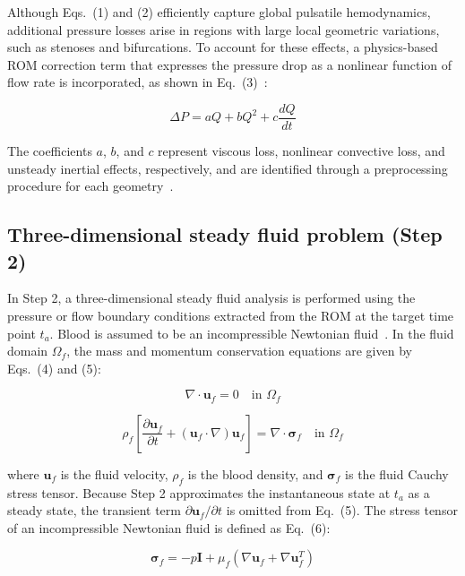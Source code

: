 \documentclass[master,english,final]{kaist-ucs}
\begin{document}
Although Eqs.~(1) and (2) efficiently capture global pulsatile hemodynamics, additional pressure losses arise in regions with large local geometric variations, such as stenoses and bifurcations. To account for these effects, a physics-based ROM correction term that expresses the pressure drop as a nonlinear function of flow rate is incorporated, as shown in Eq.~(3)~\cite{choi2025rom}:

\begin{equation}
\Delta P = aQ + bQ^2 + c\frac{dQ}{dt}
\end{equation}

The coefficients $a$, $b$, and $c$ represent viscous loss, nonlinear convective loss, and unsteady inertial effects, respectively, and are identified through a preprocessing procedure for each geometry~\cite{choi2025rom}.

\subsection{Three-dimensional steady fluid problem (Step 2)}
In Step 2, a three-dimensional steady fluid analysis is performed using the pressure or flow boundary conditions extracted from the ROM at the target time point $t_a$. Blood is assumed to be an incompressible Newtonian fluid~\cite{ku1997blood}. In the fluid domain $\Omega_f$, the mass and momentum conservation equations are given by Eqs.~(4) and (5):

\begin{equation}
\nabla \cdot \mathbf{u}_f = 0 \quad \text{in } \Omega_f
\end{equation}

\begin{equation}
\rho_f \left[\frac{\partial \mathbf{u}_f}{\partial t} + (\mathbf{u}_f \cdot \nabla)\mathbf{u}_f\right] = \nabla \cdot \boldsymbol{\sigma}_f \quad \text{in } \Omega_f
\end{equation}

where $\mathbf{u}_f$ is the fluid velocity, $\rho_f$ is the blood density, and $\boldsymbol{\sigma}_f$ is the fluid Cauchy stress tensor. Because Step 2 approximates the instantaneous state at $t_a$ as a steady state, the transient term $\partial \mathbf{u}_f/\partial t$ is omitted from Eq.~(5). The stress tensor of an incompressible Newtonian fluid is defined as Eq.~(6):

\begin{equation}
\boldsymbol{\sigma}_f = -p\mathbf{I} + \mu_f\left(\nabla\mathbf{u}_f + \nabla\mathbf{u}_f^{T}\right)
\end{equation}
\end{document}
